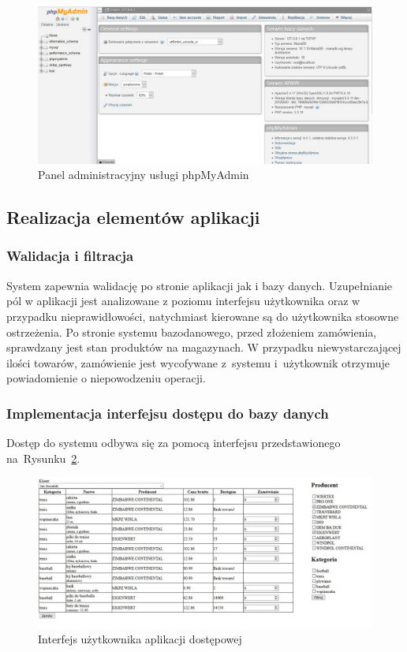 \documentclass[a4paper, 12pt]{article}
\begin{document}
\begin{figure}[H]
	\centering
	\includegraphics[width=15cm]{phpmyadmin.jpg}
	\caption[Panel administracyjny usługi phpMyAdmin]{Panel administracyjny usługi phpMyAdmin}
	\label{fig:phpMyAdmin}
\end{figure}
\subsection{Realizacja elementów aplikacji}
\subsubsection{Walidacja i filtracja}
System zapewnia walidację po stronie aplikacji jak i bazy danych. Uzupełnianie pól w aplikacji jest analizowane z poziomu interfejsu użytkownika oraz w przypadku nieprawidłowości, natychmiast kierowane są do użytkownika stosowne ostrzeżenia. Po stronie systemu bazodanowego, przed złożeniem zamówienia, sprawdzany jest stan produktów na magazynach. W przypadku niewystarczającej ilości towarów, zamówienie jest wycofywane z~systemu i~użytkownik otrzymuje powiadomienie o niepowodzeniu operacji.
\subsubsection{Implementacja interfejsu dostępu do bazy danych}
Dostęp do systemu odbywa się za pomocą interfejsu przedstawionego na~Rysunku~\ref{fig:interfejsUżytkownika}.

\begin{figure}[H]
	\includegraphics[width=14cm]{Screeny/Filtrowanie2.JPG}
	\caption[Interfejs użytkownika]{Interfejs użytkownika aplikacji dostępowej}
	\label{fig:interfejsUżytkownika}
\end{figure}
\end{document}
